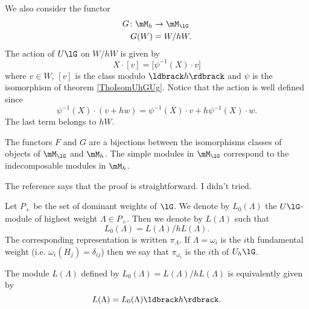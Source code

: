 We also consider the functor
\begin{equation}
    \begin{aligned}
        G\colon \mM_h&\to \mM_{\lG} \\
        G(W)&= W/hW. 
    \end{aligned}
\end{equation}
The action of \( U\lG\) on \( W/hW\) is given by
\begin{equation}
    X\cdot [v]=\big[ \psi^{-1}(X)\cdot v \big]
\end{equation}
where \( v\in W\), \( [v]\) is the class modulo \( \ldbrack h\rdbrack\) and \( \psi\) is the isomorphism of theorem \ref{ThoIsomUhGUg}. Notice that the action is well defined since
\begin{equation}
    \psi^{-1}(X)\cdot(v+hw)=\psi^{-1}(X)\cdot v+h\psi^{-1}(X)\cdot w.
\end{equation}
The last term belongs to \( hW\).

\begin{proposition}
    The functors \( F\) and \( G\) are a bijections between the isomorphisms classes of objects of \( \mM_{\lG}\) and \( \mM_h\). The simple modules in \( \mM_{\lG}\) correspond to the indecomposable modules in \( \mM_h\).
\end{proposition}
The reference \cite{SoibelmanI} says that the proof is straightforward. I didn't tried.

Let \( P_+\) be the set of dominant weights of \( \lG\). We denote by \( L_0(\Lambda)\) the \( U\lG\)-module of highest weight \( \Lambda\in P_+\). Then we denote by \( L(\Lambda)\) such that
\begin{equation}
    L_0(\Lambda)=L(\Lambda)/hL(\Lambda).
\end{equation}
The corresponding representation is written \( \pi_{\Lambda}\). If \( \Lambda=\omega_i\) is the \( i\)th fundamental weight (i.e. \( \omega_i(H_j)=\delta_{ij}\)) then we say that \( \pi_{\omega_i}\) is the \( i\)th  of \( U_h\lG\).

\begin{lemma}
    The module \( L(\Lambda)\) defined by \( L_0(\Lambda)=L(\Lambda)/hL(\Lambda) \) is equivalently given by
    \begin{equation}
        L(\Lambda)=L_0(\Lambda)\ldbrack h\rdbrack.
    \end{equation}
\end{lemma}

